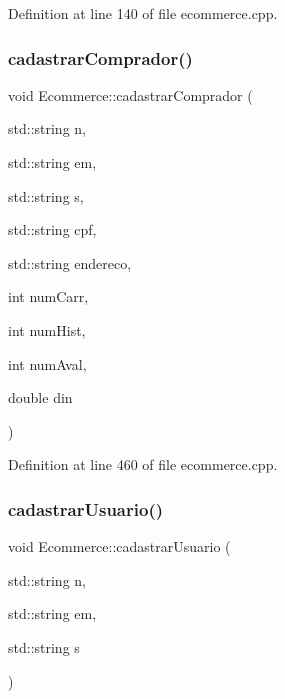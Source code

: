 Definition at line 140 of file ecommerce.\+cpp.

\mbox{\label{class_ecommerce_a6800ded87479fc4ef9aa162e4cb5e6a9}} 
\subsubsection{\texorpdfstring{cadastrar\+Comprador()}{cadastrarComprador()}}
{\footnotesize\ttfamily void Ecommerce\+::cadastrar\+Comprador (\begin{DoxyParamCaption}\item[{std\+::string}]{n,  }\item[{std\+::string}]{em,  }\item[{std\+::string}]{s,  }\item[{std\+::string}]{cpf,  }\item[{std\+::string}]{endereco,  }\item[{int}]{num\+Carr,  }\item[{int}]{num\+Hist,  }\item[{int}]{num\+Aval,  }\item[{double}]{din }\end{DoxyParamCaption})}



Definition at line 460 of file ecommerce.\+cpp.

\mbox{\label{class_ecommerce_ac43526249f4aefbee0c8e4fd5c6f45f2}} 
\subsubsection{\texorpdfstring{cadastrar\+Usuario()}{cadastrarUsuario()}}
{\footnotesize\ttfamily void Ecommerce\+::cadastrar\+Usuario (\begin{DoxyParamCaption}\item[{std\+::string}]{n,  }\item[{std\+::string}]{em,  }\item[{std\+::string}]{s }\end{DoxyParamCaption})}

\mbox{\label{class_ecommerce_aec1f281b4fca31a69117ddc5524c5579}} 

